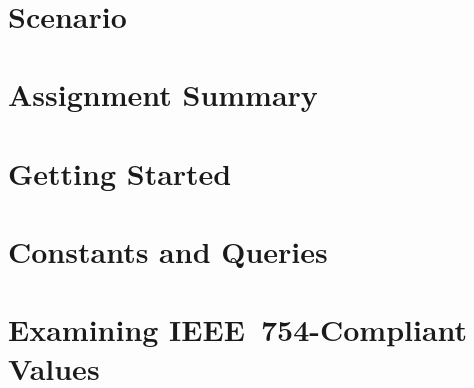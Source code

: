




\renewcommand{\labnumber}{\floatlabnumber}
\renewcommand{\labname}{Floating Point Representation and Arithmetic Lab}
\renewcommand{\shortlabname}{floatlab}
\renewcommand{\collaborationrules}{\floatlabcollaboration}
\renewcommand{\duedate}{\floatlabdue}

\pagelayout

    \labidentifier\


    \softwareengineeringfrontmatter

    \section*{Scenario}                                                 \WriteAnFPU

    \section{Assignment Summary}                                        

    \section{Getting Started}                                           

    \section{Constants and Queries} \label{sec:constantsAndQueries}     

    \section{Examining IEEE~754-Compliant Values}                       

